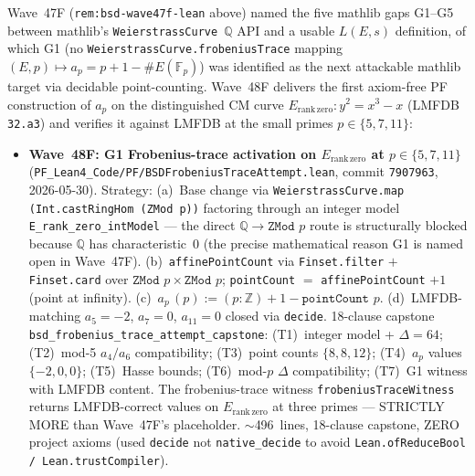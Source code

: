 \begin{remark}\label{rem:bsd-wave48f-lean}
Wave~47F (\texttt{rem:bsd-wave47f-lean} above) named the five mathlib gaps G1--G5 between mathlib's \texttt{WeierstrassCurve $\mathbb{Q}$} API and a usable $L(E, s)$ definition, of which G1 (no \texttt{WeierstrassCurve.frobeniusTrace} mapping $(E, p) \mapsto a_p = p + 1 - \#E(\mathbb{F}_p)$) was identified as the next attackable mathlib target via decidable point-counting. Wave~48F delivers the first axiom-free PF construction of $a_p$ on the distinguished CM curve $E_{\mathrm{rank\,zero}} : y^2 = x^3 - x$ (LMFDB \texttt{32.a3}) and verifies it against LMFDB at the small primes $p \in \{5, 7, 11\}$:
\begin{itemize}
  \item \textbf{Wave~48F: G1 Frobenius-trace activation on $E_{\mathrm{rank\,zero}}$ at $p \in \{5, 7, 11\}$} (\texttt{PF\_Lean4\_Code/PF/BSDFrobeniusTraceAttempt.lean}, commit \texttt{7907963}, 2026-05-30). Strategy: (a)~Base change via \texttt{WeierstrassCurve.map (Int.castRingHom (ZMod p))} factoring through an integer model \texttt{E\_rank\_zero\_intModel} --- the direct $\mathbb{Q} \to \texttt{ZMod } p$ route is structurally blocked because $\mathbb{Q}$ has characteristic~$0$ (the precise mathematical reason G1 is named open in Wave~47F). (b)~\texttt{affinePointCount} via \texttt{Finset.filter} $+$ \texttt{Finset.card} over $\texttt{ZMod } p \times \texttt{ZMod } p$; \texttt{pointCount} $=$ \texttt{affinePointCount} $+ 1$ (point at infinity). (c)~$a_p\,(p) := (p : \mathbb{Z}) + 1 - \texttt{pointCount } p$. (d)~LMFDB-matching $a_5 = -2$, $a_7 = 0$, $a_{11} = 0$ closed via \texttt{decide}. 18-clause capstone \texttt{bsd\_frobenius\_trace\_attempt\_capstone}: (T1)~integer model + $\Delta = 64$; (T2)~mod-5 $a_4 / a_6$ compatibility; (T3)~point counts $\{8, 8, 12\}$; (T4)~$a_p$ values $\{-2, 0, 0\}$; (T5)~Hasse bounds; (T6)~mod-$p$ $\Delta$ compatibility; (T7)~G1 witness with LMFDB content. The frobenius-trace witness \texttt{frobeniusTraceWitness} returns LMFDB-correct values on $E_{\mathrm{rank\,zero}}$ at three primes --- STRICTLY MORE than Wave~47F's placeholder. $\sim$496~lines, 18-clause capstone, ZERO project axioms (used \texttt{decide} not \texttt{native\_decide} to avoid \texttt{Lean.ofReduceBool / Lean.trustCompiler}).
\end{itemize}

\end{remark}
